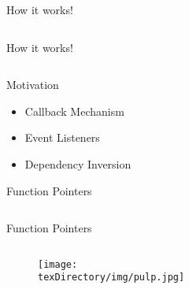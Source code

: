 \documentclass[compress]{beamer}
\begin{document}
\begin{slide}
	\begin{block}{How it works!}

	\inputminted[fontsize=\footnotesize, firstline=10, lastline=20, linenos]{c}{
		\resDirectory/ls12-ptrfunc1.c
	}

	\end{block}
\end{slide}

\begin{slide}
	\begin{block}{How it works!}

	\inputminted[fontsize=\footnotesize, firstline=22, linenos]{c}{
		\resDirectory/ls12-ptrfunc1.c
	}

	\end{block}
\end{slide}

\begin{slide}
	\begin{block}{Motivation}

	\begin{itemize}
	\item[] Callback Mechanism
	\item[] Event Listeners
	\item[] Dependency Inversion
	\end{itemize}

	\end{block}
\end{slide}

\begin{slide}
	\begin{block}{Function Pointers}

	\inputminted[fontsize=\footnotesize, firstline=10, lastline=20, linenos]{c}{
		\resDirectory/ls12-ptrfunc2.c
	}

	\end{block}
\end{slide}

\begin{slide}
	\begin{block}{Function Pointers}

	\inputminted[fontsize=\footnotesize, firstline=22, linenos]{c}{
		\resDirectory/ls12-ptrfunc2.c
	}

	\end{block}
\end{slide}

\begin{slide}
	\begin{figure}
	\texttt{[image: \\texDirectory/img/pulp.jpg]}
	\end{figure}
\end{slide}
\end{document}

